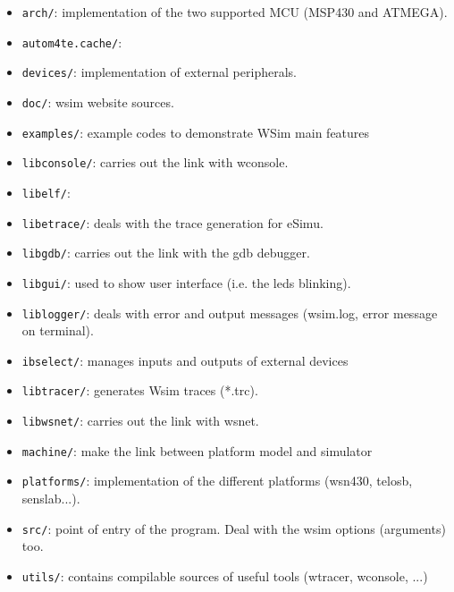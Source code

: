 \documentclass[a4paper,10pt]{report}
\begin{document}
\begin{itemize}
  \item \verb$arch/$: implementation of the two supported MCU (MSP430 and ATMEGA).

  \item \verb$autom4te.cache/$:

  \item \verb$devices/$: implementation of external peripherals.

  \item \verb$doc/$: wsim website sources.

  \item \verb$examples/$: example codes to demonstrate WSim main features

  \item \verb$libconsole/$: carries out the link with wconsole.

  \item \verb$libelf/$:

  \item \verb$libetrace/$: deals with the trace generation for eSimu.

  \item \verb$libgdb/$: carries out the link with the gdb debugger.

  \item \verb$libgui/$: used to show user interface (i.e. the leds blinking).

  \item \verb$liblogger/$: deals with error and output messages (wsim.log, error message on terminal).

  \item \verb$ibselect/$: manages inputs and outputs of external devices

  \item \verb$libtracer/$: generates Wsim traces (*.trc).

  \item \verb$libwsnet/$: carries out the link with wsnet.

  \item \verb$machine/$: make the link between platform model and simulator

  \item \verb$platforms/$: implementation of the different platforms (wsn430, telosb, senslab...).

  \item \verb$src/$: point of entry of the program. Deal with the wsim options (arguments) too.

  \item \verb$utils/$: contains compilable sources of useful tools (wtracer, wconsole, ...)
\end{itemize}
\end{document}

